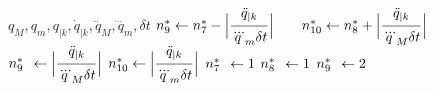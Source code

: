 \begin{figure}[!htbp]
\begin{minipage}{\textwidth}
\begin{algorithm}[H]
\begin{algorithmic}[1]
\Require $q_M, q_m, q_{|k}, \dot{q}_{|k},\dddot{q}_{M},\dddot{q}_{m}, \delta t$
 
 
{}%
            {$n_{9}^{*} \gets n_{7}^{*}-\abs[\Big]{\myfrac[5pt]{\ddot{q}_{|k}}{\dddot{q}_m \delta t}} \qquad n_{10}^{*} \gets n_{8}^{*}+\abs[\Big]{\myfrac[5pt]{\ddot{q}_{|k}}{\dddot{q}_M \delta t}}$}%
            {$n_{9}^{*} \hspace{1.5mm}\gets \abs[\Big]{\myfrac[5pt]{\ddot{q}_{|k}}{\dddot{q}_M \delta t}}$}%
\vspace{2mm}
            {$n_{10}^{*} \gets \abs[\Big]{\myfrac[5pt]{\ddot{q}_{|k}}{\dddot{q}_m \delta t}}$}%
        \EndIf
{}%
            {$n_{7}^{*} \hspace{1.5mm}\gets 1$}%
            {$n_{8}^{*} \hspace{1.5mm}\gets 1$}%
            {$n_{9}^{*} \hspace{1.5mm}\gets 2$}%

\end{algorithmic}
\end{algorithm}
\end{minipage}
\end{figure}

